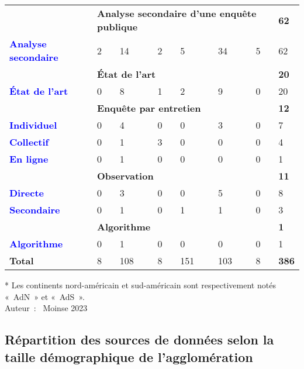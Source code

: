 \begin{table}[h]
\begin{tabular}{p{3.9cm}p{1.1cm}p{1.1cm}p{1.1cm}p{1.1cm}p{1.1cm}p{1.1cm}p{1.1cm}}
            \hline
        & \multicolumn{6}{l}{\textbf{Analyse secondaire d'une enquête publique}} & \textbf{62}\\
        \textcolor{blue}{\textbf{Analyse secondaire}} & 2 & 14 & 2 & 5 & 34 & 5 & 62\\
            \hline
        & \multicolumn{6}{l}{\textbf{État de l'art}} & \textbf{20}\\
        \textcolor{blue}{\textbf{État de l'art}} & 0 & 8 & 1 & 2 & 9 & 0 & 20\\
            \hline
        & \multicolumn{6}{l}{\textbf{Enquête par entretien}} & \textbf{12}\\
        \textcolor{blue}{\textbf{Individuel}} & 0	& 4 & 0 & 0 & 3 & 0 & 7\\
        \textcolor{blue}{\textbf{Collectif}} & 0 & 1 & 3 & 0 & 0 & 0 & 4\\
        \textcolor{blue}{\textbf{En ligne}} & 0 & 1 & 0 & 0 & 0 & 0 & 1\\
            \hline
        & \multicolumn{6}{l}{\textbf{Observation}} & \textbf{11}\\
        \textcolor{blue}{\textbf{Directe}} & 0 & 3 & 0 & 0 & 5 & 0 & 8\\
        \textcolor{blue}{\textbf{Secondaire}} & 0 & 1 & 0 & 1 & 1 & 0 & 3\\
             \hline
        & \multicolumn{6}{l}{\textbf{Algorithme}} & \textbf{1}\\
        \textcolor{blue}{\textbf{Algorithme}} & 0 & 1 & 0 & 0 & 0 & 0 & 1\\
            \hline
        \textbf{Total} & 8 & 108 & 8 & 151 & 103 & 8 & \textbf{386}\\
        \end{tabular}
    \caption*{}
    \label{Annexe RSL tableau sources de données continent}
        \begin{flushright}
    \scriptsize
    * Les continents nord-américain et sud-américain sont respectivement notés «~AdN~» et «~AdS~».
    \\
    Auteur~: \textcopyright~Moinse 2023
        \end{flushright}
        \end{table}

    \newpage
\subsection{Répartition des sources de données selon la taille démographique de l'agglomération}
    \label{donnees-ouvertes:rsl_publications_sources_donnees_par_taille_agglomeration}

